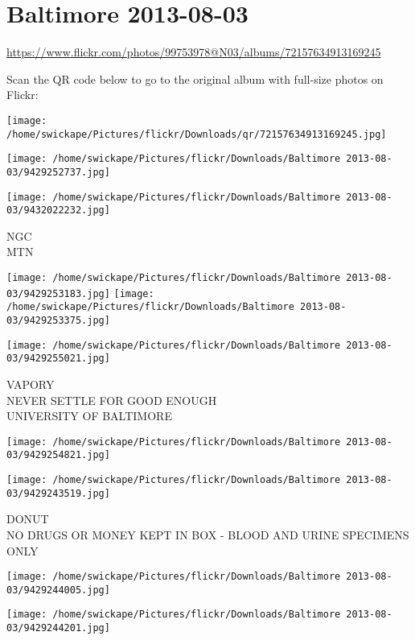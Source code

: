 \documentclass[10pt,letterpaper]{article}
\title{}
\author{}
\date{}
\begin{document}
\section*{Baltimore 2013-08-03}

\url{https://www.flickr.com/photos/99753978@N03/albums/72157634913169245}

Scan the QR code below to go to the original album with full-size photos on Flickr:

\texttt{[image: /home/swickape/Pictures/flickr/Downloads/qr/72157634913169245.jpg]}
\pagebreak

\texttt{[image: /home/swickape/Pictures/flickr/Downloads/Baltimore 2013-08-03/9429252737.jpg]}

\vspace{0.25in}
\texttt{[image: /home/swickape/Pictures/flickr/Downloads/Baltimore 2013-08-03/9432022232.jpg]}

NGC\\
MTN
\pagebreak

\texttt{[image: /home/swickape/Pictures/flickr/Downloads/Baltimore 2013-08-03/9429253183.jpg]}
\texttt{[image: /home/swickape/Pictures/flickr/Downloads/Baltimore 2013-08-03/9429253375.jpg]}

\vspace{0.25in}
\texttt{[image: /home/swickape/Pictures/flickr/Downloads/Baltimore 2013-08-03/9429255021.jpg]}

VAPORY\\
NEVER SETTLE FOR GOOD ENOUGH\\
UNIVERSITY OF BALTIMORE
\pagebreak

\texttt{[image: /home/swickape/Pictures/flickr/Downloads/Baltimore 2013-08-03/9429254821.jpg]}

\vspace{0.25in}
\texttt{[image: /home/swickape/Pictures/flickr/Downloads/Baltimore 2013-08-03/9429243519.jpg]}

DONUT\\
NO DRUGS OR MONEY KEPT IN BOX {-} BLOOD AND URINE SPECIMENS ONLY
\pagebreak

\texttt{[image: /home/swickape/Pictures/flickr/Downloads/Baltimore 2013-08-03/9429244005.jpg]}

\vspace{0.25in}
\texttt{[image: /home/swickape/Pictures/flickr/Downloads/Baltimore 2013-08-03/9429244201.jpg]}
\end{document}
